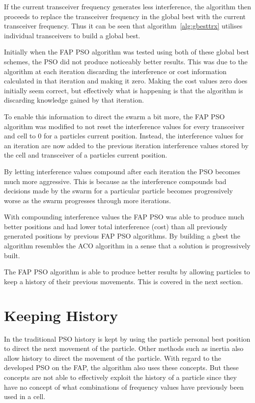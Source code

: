 If the current transceiver frequency generates less interference, the algorithm then proceeds to replace the transceiver frequency in the global best with the current transceiver frequency. Thus it can be seen that algorithm~\ref{alg:gbesttrx} utilises individual transceivers to build a global best.

Initially when the \gls{FAP} \gls{PSO} algorithm was tested using both of these global best schemes, the \gls{PSO} did not produce noticeably better results. This was due to the algorithm at each iteration discarding the interference or cost information calculated in that iteration and making it zero. Making the cost values zero does initially seem correct, but effectively what is happening is that the algorithm is discarding knowledge gained by that iteration.

To enable this information to direct the swarm a bit more, the \gls{FAP} \gls{PSO} algorithm was modified to not reset the interference values for every transceiver and cell to 0 for a particles current position. Instead, the interference values for an iteration are now added to the previous iteration interference values stored by the cell and transceiver of a particles current position. 

By letting interference values compound after each iteration the \gls{PSO} becomes much more aggressive. This is because as the interference compounds bad decisions made by the swarm for a particular particle becomes progressively worse as the swarm progresses through more iterations.

With compounding interference values the \gls{FAP} \gls{PSO} was able to produce much better positions and had lower total interference (cost) than all previously generated positions by previous \gls{FAP} \gls{PSO} algorithms. By building a gbest the algorithm resembles the ACO algorithm in a sense that a solution is progressively built.

The \gls{FAP} \gls{PSO} algorithm is able to produce better results by allowing particles to keep a history of their previous movements. This is covered in the next section.
\section{Keeping History}
\label{sec:keepinghistory}
In the traditional \gls{PSO} history is kept by using the particle personal best position to direct the next movement of the particle. Other methods such as inertia also allow history to direct the movement of the particle. With regard to the developed \gls{PSO} on the \gls{FAP}, the algorithm also uses these concepts. But these concepts are not able to effectively exploit the history of a particle since they have no concept of what combinations of frequency values have previously been used in a cell.

